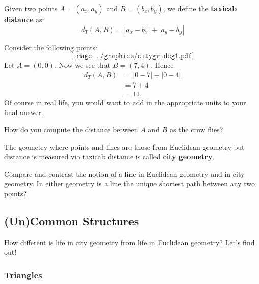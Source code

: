 
\begin{definition}Given two points $A = (a_x,a_y)$ and $B = (b_x,b_y)$, we define the
\textbf{taxicab distance} as:
\[
d_T(A,B) = |a_x - b_x| + |a_y - b_y|
\]
\end{definition}


\begin{example} Consider the following points:
\[
\texttt{[image: ../graphics/citygrideg1.pdf]}
\]
Let $A = (0,0)$. Now we see that $B = (7,4)$. Hence
\begin{align*}
d_T(A,B) &= |0 - 7| + |0-4|\\
&= 7 + 4 \\
&= 11.
\end{align*}
Of course in real life, you would want to add in the appropriate units
to your final answer.
\end{example}

\begin{question} How do you compute the distance between $A$ and $B$ as the crow flies?
\end{question}
\QM

\begin{definition}
The geometry where points and lines are those from Euclidean geometry
but distance is measured via taxicab distance is called \textbf{city
  geometry}.
\end{definition}

\begin{question} Compare and contrast the notion of a line in Euclidean geometry and in city geometry. In either geometry is a line the unique shortest path between any two points?
\end{question}
\QM



\subsection{(Un)Common Structures}

How different is life in city geometry from life in Euclidean
geometry? Let's find out!

\subsubsection{Triangles}

